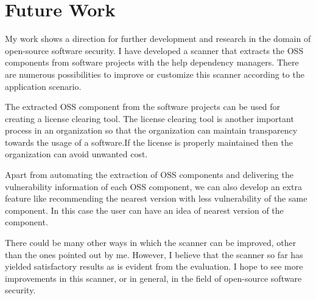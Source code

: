 %
\section{Future Work}\label{sec:future_work}
%
My work shows a direction for further development and research in the domain of open-source software security. I have developed a scanner that extracts the \acs{OSS} components from software projects with the help dependency managers. There are numerous
possibilities to improve or customize this scanner according to the application scenario.

The extracted \acs{OSS} component from the software projects can be used for creating a license clearing tool. The license clearing tool is another important process in an organization so that the organization can maintain transparency towards the usage of a software.If the license is properly maintained then the organization can avoid unwanted cost.

Apart from automating the extraction of \acs{OSS} components and delivering the vulnerability information of each \acs{OSS} component, we can also develop an extra feature like recommending the nearest version with less vulnerability of the same component. In this case the user can have an idea of nearest version of the component.

There could be many other ways in which the scanner can be improved, other than the ones pointed out by me. However, I believe that the scanner so far has yielded satisfactory results as is evident from the evaluation. I hope to see more improvements in this scanner, or in general, in the field of open-source software security.
%
